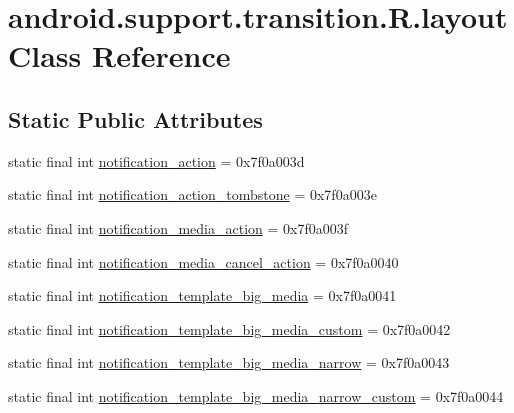 \hypertarget{classandroid_1_1support_1_1transition_1_1R_1_1layout}{}\section{android.\+support.\+transition.\+R.\+layout Class Reference}
\label{classandroid_1_1support_1_1transition_1_1R_1_1layout}
\subsection*{Static Public Attributes}
\begin{DoxyCompactItemize}
\item 
static final int \mbox{\hyperlink{classandroid_1_1support_1_1transition_1_1R_1_1layout_a3134dda494a06cd67a831ff544ed3794}{notification\+\_\+action}} = 0x7f0a003d
\item 
static final int \mbox{\hyperlink{classandroid_1_1support_1_1transition_1_1R_1_1layout_add1ee4fa5428d4691c03956d3e88f746}{notification\+\_\+action\+\_\+tombstone}} = 0x7f0a003e
\item 
static final int \mbox{\hyperlink{classandroid_1_1support_1_1transition_1_1R_1_1layout_ae6003676b122981e29e4bb640ec2f37d}{notification\+\_\+media\+\_\+action}} = 0x7f0a003f
\item 
static final int \mbox{\hyperlink{classandroid_1_1support_1_1transition_1_1R_1_1layout_acda2854fab6170de932a0f7316aca9f1}{notification\+\_\+media\+\_\+cancel\+\_\+action}} = 0x7f0a0040
\item 
static final int \mbox{\hyperlink{classandroid_1_1support_1_1transition_1_1R_1_1layout_ab6f7685cad6063151a93b39cb39aad40}{notification\+\_\+template\+\_\+big\+\_\+media}} = 0x7f0a0041
\item 
static final int \mbox{\hyperlink{classandroid_1_1support_1_1transition_1_1R_1_1layout_afa5ecfe60d204aec5be49d2d5745df98}{notification\+\_\+template\+\_\+big\+\_\+media\+\_\+custom}} = 0x7f0a0042
\item 
static final int \mbox{\hyperlink{classandroid_1_1support_1_1transition_1_1R_1_1layout_ac6718b9be936edf260a3e1829cac7943}{notification\+\_\+template\+\_\+big\+\_\+media\+\_\+narrow}} = 0x7f0a0043
\item 
static final int \mbox{\hyperlink{classandroid_1_1support_1_1transition_1_1R_1_1layout_a9d97a4bb520b7edd593529f7062d8934}{notification\+\_\+template\+\_\+big\+\_\+media\+\_\+narrow\+\_\+custom}} = 0x7f0a0044
\item 

\end{DoxyCompactItemize}
